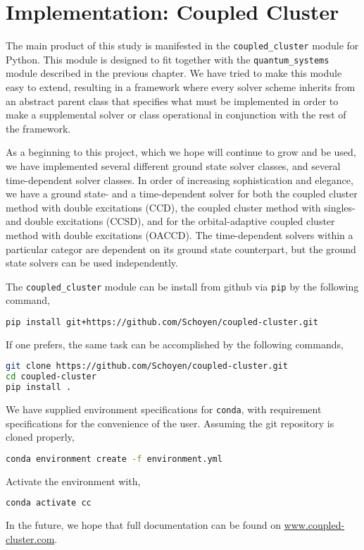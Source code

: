 \chapter{Implementation: Coupled Cluster}

The main product of this study is manifested in the \lstinline{coupled_cluster}
module for Python. This module is designed to fit together with the
\lstinline{quantum_systems} module described in the previous chapter. We have tried to 
make this module easy to extend, resulting in a framework where every solver scheme 
inherits from an abstract parent class that specifies what must be implemented in order 
to make a supplemental solver or class operational in conjunction with the rest of the 
framework.

As a beginning to this project, which we hope will continue to grow and be used, 
we have implemented several different ground state solver classes, and several
time-dependent solver classes. In order of increasing sophistication and 
elegance, we have a ground state- and a time-dependent solver for both the coupled cluster
method
with double excitations (CCD), the coupled cluster method with singles- and double 
excitations (CCSD), and for the orbital-adaptive coupled cluster method with double
excitations (OACCD). The time-dependent solvers within a particular categor are 
dependent on its ground state counterpart, but the ground state solvers can be used
independently.

The \lstinline{coupled_cluster} module can be install from github via \lstinline{pip}
by the following command,
\begin{lstlisting}[language=bash]
pip install git+https://github.com/Schoyen/coupled-cluster.git
\end{lstlisting}
If one prefers, the same task can be accomplished by the following commands,
\begin{lstlisting}[language=bash]
git clone https://github.com/Schoyen/coupled-cluster.git
cd coupled-cluster
pip install .
\end{lstlisting}
We have supplied environment specifications for \lstinline{conda}, with requirement 
specifications for the convenience of the user. Assuming the git repository is cloned 
properly,
\begin{lstlisting}[language=bash]
conda environment create -f environment.yml
\end{lstlisting}
Activate the environment with,
\begin{lstlisting}[language=bash]
conda activate cc
\end{lstlisting}
In the future, we hope that full documentation can be found on
\url{www.coupled-cluster.com}.

